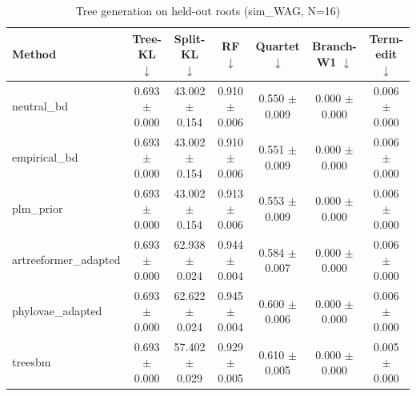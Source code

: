 \begin{table}[t]\centering
\caption{Tree generation on held-out roots (sim_WAG, N=16)}
\begin{tabular}{lcccccc}
\toprule
Method & Tree-KL $\downarrow$ & Split-KL $\downarrow$ & RF $\downarrow$ & Quartet $\downarrow$ & Branch-W1 $\downarrow$ & Term-edit $\downarrow$ \\
\midrule
neutral\_bd & 0.693 $\pm$ 0.000 & 43.002 $\pm$ 0.154 & 0.910 $\pm$ 0.006 & 0.550 $\pm$ 0.009 & 0.000 $\pm$ 0.000 & 0.006 $\pm$ 0.000 \\
empirical\_bd & 0.693 $\pm$ 0.000 & 43.002 $\pm$ 0.154 & 0.910 $\pm$ 0.006 & 0.551 $\pm$ 0.009 & 0.000 $\pm$ 0.000 & 0.006 $\pm$ 0.000 \\
plm\_prior & 0.693 $\pm$ 0.000 & 43.002 $\pm$ 0.154 & 0.913 $\pm$ 0.006 & 0.553 $\pm$ 0.009 & 0.000 $\pm$ 0.000 & 0.006 $\pm$ 0.000 \\
artreeformer\_adapted & 0.693 $\pm$ 0.000 & 62.938 $\pm$ 0.024 & 0.944 $\pm$ 0.004 & 0.584 $\pm$ 0.007 & 0.000 $\pm$ 0.000 & 0.006 $\pm$ 0.000 \\
phylovae\_adapted & 0.693 $\pm$ 0.000 & 62.622 $\pm$ 0.024 & 0.945 $\pm$ 0.004 & 0.600 $\pm$ 0.006 & 0.000 $\pm$ 0.000 & 0.006 $\pm$ 0.000 \\
treesbm & 0.693 $\pm$ 0.000 & 57.402 $\pm$ 0.029 & 0.929 $\pm$ 0.005 & 0.610 $\pm$ 0.005 & 0.000 $\pm$ 0.000 & 0.005 $\pm$ 0.000 \\
\bottomrule
\end{tabular}
\end{table}